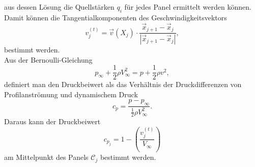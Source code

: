 aus dessen Lösung die Quellstärken $q_i$ für jedes Panel ermittelt werden können. \\
Damit können die Tangentialkomponenten des Geschwindigkeitsvektors
\begin{equation}
\label{eqn:vt}
v_j^{(t)} =  \vec v(X_j) \cdot \frac{\vec x_{j+1}-\vec x_j}{|\vec x_{j+1}-\vec x_j|},
\end{equation}
bestimmt werden. \\
Aus der Bernoulli-Gleichung
\begin{equation}
p_{\infty} + \frac{1}{2} \rho V_{\infty}^2 =  p + \frac{1}{2} \rho v^2,
\end{equation}
definiert man den Druckbeiwert als das Verhältnis der Druckdifferenzen von Profilanströmung und dynamischem Druck 
\begin{equation}
c_p =  \frac{p-p_{\infty}}{\frac{1}{2} \rho V_{\infty}^2}.
\end{equation}
Daraus kann der Druckbeiwert
\begin{equation}
c_{p_j} =  1 - \left( \frac{v_j^{(t)}}{V_{\infty}}\right)
\end{equation}
am Mittelpunkt des Panels $\mathcal{C}_j$ bestimmt werden. \cite{Hess:1966} \cite{Cebeci:1999} 
